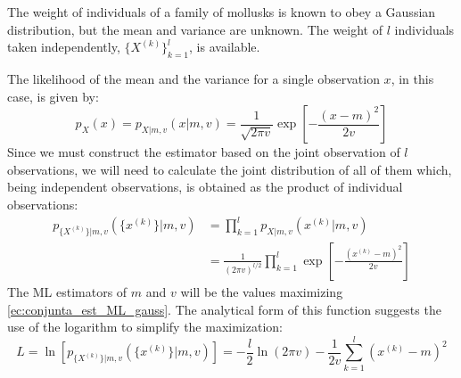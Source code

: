 \begin{example}
\label{ex:gauss_ML}

The weight of individuals of a family of mollusks is known to obey a Gaussian distribution, but the mean and variance are unknown. The weight of $l$ individuals taken independently, $\{X^{(k)}\}_{k=1}^l$, is available.

The likelihood of the mean and the variance for a single observation $x$, in this case, is given by:
\begin{equation}
p_{X}(x) = p_{X|m,v}(x|m,v) = \frac{1}{\sqrt{2\pi v}} \exp\left[-\frac{(x-m)^2}{2 v}\right]
\end{equation}
Since we must construct the estimator based on the joint observation of $l$ observations, we will need to calculate the joint distribution of all of them which, being independent observations, is obtained as the product of individual observations:
\begin{equation}
\label{ec:conjunta_est_ML_gauss}
\begin{split}
p_{\{X^{(k)}\}|m,v}(\{x^{(k)}\}|m,v) 
	& = \prod_{k=1}^l p_{X|m,v}(x^{(k)}|m,v) \\ 
		&= \frac{1}{(2\pi v)^{l/2}} \prod_{k=1}^l \exp\left[-\frac{(x^{(k)}-m)^2}{2 v}\right]
\end{split}
\end{equation}
The ML estimators of $m$ and $v$ will be the values maximizing \eqref{ec:conjunta_est_ML_gauss}. The analytical form of this function suggests the use of the logarithm to simplify the maximization:
\begin{equation}
\label{ec:conjunta_est_ML_gauss_log}
L = \ln \left[ p_{\{X^{(k)}\}|m,v}(\{x^{(k)}\}|m,v) \right] = -\frac{l}{2} \ln(2\pi v) - \frac{1}{2v} \sum_{k=1}^l (x^{(k)}-m)^2
\end{equation}


\end{example}
